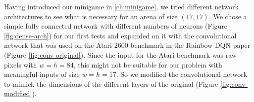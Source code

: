 
Having introduced our minigame in \ref{ch:minigame}, we tried different network architectures to see what is necessary for an arena of size $(17, 17)$.
We chose a simple fully connected network with different numbers of neurons (Figure \ref{fig:dense-arch}) for our first tests and expanded on it with the convolutional network that was used on the Atari 2600 benchmark in the Rainbow DQN paper\cite{Hessel2018RainbowCI} (Figure \ref{fig:conv-original}). Since the input for the Atari benchmark was raw pixels with $w=h=84$, this might not be suitable for our problem with meaningful inputs of size $w=h=17$. So we modified the convolutional network to mimick the dimensions of the different layers of the original (Figure \ref{fig:conv-modified}).



